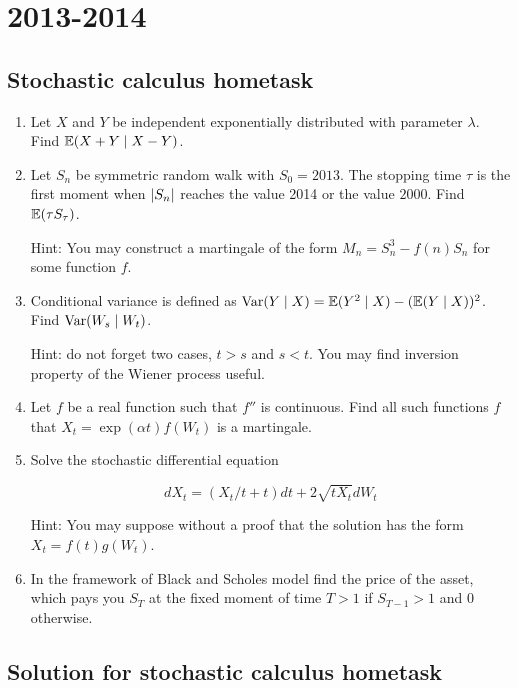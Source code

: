 \documentclass[12pt, a4paper]{article}
\DeclarePairedDelimiter{\abs}{\lvert}{\rvert}
\begin{document}
\section{2013-2014}

\subsection{Stochastic calculus hometask}

\begin{enumerate}

\item Let $X$ and $Y$ be independent exponentially distributed with parameter $\lambda$. Find $\operatorname{\mathbb{E}}(X+Y \mid X-Y)$.

\item Let $S_n$ be symmetric random walk with $S_0=2013$. The stopping time $\tau$ is the first moment when $\abs{S_n}$ reaches the value 2014 or the value $2000$. Find $\operatorname{\mathbb{E}}(\tau S_{\tau})$.

Hint: You may construct a martingale of the form $M_n=S_n^3-f(n)S_n$ for some function $f$.

\item Conditional variance is defined as $\operatorname{Var}(Y \mid X)=\operatorname{\mathbb{E}}(Y^2 \mid X) - (\operatorname{\mathbb{E}}(Y \mid X) )^2$. Find $\operatorname{Var}(W_s \mid W_t)$.

Hint: do not forget two cases, $t>s$ and $s<t$. You may find inversion property of the Wiener process useful.

\item Let $f$ be a real function such that $f''$ is continuous. Find all such functions $f$ that $X_t=\exp(\alpha t)f(W_t)$ is a martingale.

\item Solve the stochastic differential equation

\[
dX_t=(X_t/t+t)dt+2\sqrt{tX_t}dW_t
\]

Hint: You may suppose without a proof that the solution has the form $X_t=f(t)g(W_t)$.

\item In the framework of Black and Scholes model find the price of the asset, which pays you $S_T$ at the fixed moment of time $T>1$ if $S_{T-1}>1$ and $0$ otherwise.


\end{enumerate}

\subsection{Solution for stochastic calculus hometask}
\end{document}
